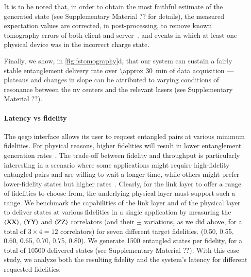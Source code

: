 It is to be noted that, in order to obtain the most faithful estimate of the generated state (see
Supplementary Material ?? for details), the measured expectation values are corrected, in
post-processing, to remove known tomography errors of both client and
server~\cite{nachman_2020_unfolding}, and events in which at least one physical device was in the
incorrect charge state.

Finally, we show, in \cref{fig:fstomography}d, that our system can sustain a fairly stable
entanglement delivery rate over \qty{\approx 30}{min} of data acquisition --- plateaus and changes
in slope can be attributed to varying conditions of resonance between the \acrshort{nv} centers and
the relevant lasers (see Supplementary Material ??).

\paragraph{Latency vs fidelity}

The \acrshort{qegp} interface allows its user to request entangled pairs at various minimum
fidelities. For physical reasons, higher fidelities will result in lower entanglement generation
rates~\cite{stockill_2017_phasetuned, humphreys_2018_delivery}. The trade-off between fidelity and
throughput is particularly interesting in a scenario where some applications might require
high-fidelity entangled pairs and are willing to wait a longer time, while others might prefer
lower-fidelity states but higher rates~\cite{dahlberg_2019_egp}. Clearly, for the link layer to
offer a range of fidelities to choose from, the underlying physical layer must support such a range.
We benchmark the capabilities of the link layer and of the physical layer to deliver states at
various fidelities in a single application by measuring the $\braket{\mathrm{XX}}$,
$\braket{\mathrm{YY}}$ and $\braket{\mathrm{ZZ}}$ correlators (and their $\pm$ variations, as we did
above, for a total of $3 \times 4 = 12$ correlators) for seven different target fidelities,
(\num{0.50}, \num{0.55}, \num{0.60}, \num{0.65}, \num{0.70}, \num{0.75}, \num{0.80}). We generate
\num{1500} entangled states per fidelity, for a total of \num{10500} delivered states (see
Supplementary Material ??). With this case study, we analyze both the resulting fidelity and the
system's latency for different requested fidelities.

